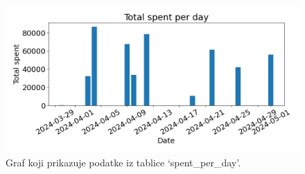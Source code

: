 \begin{figure}
    \centering
    \includegraphics[width=0.8\linewidth]{images/myplot.png}
    \caption{Graf koji prikazuje podatke iz tablice `spent\_per\_day'.}
    \label{figure:spent_per_day_graph}
\end{figure}
